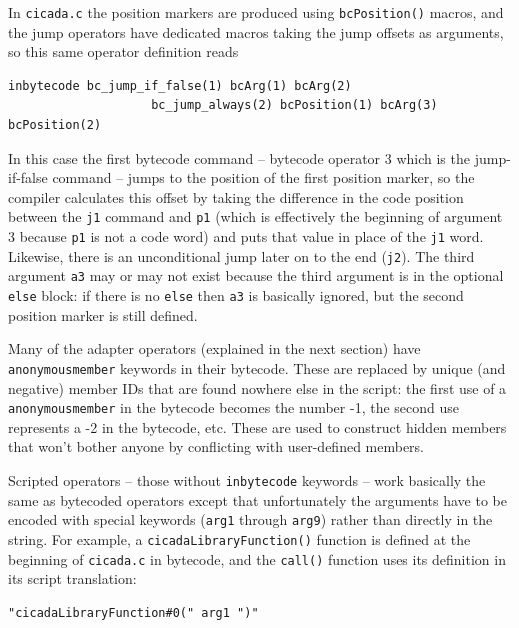 \documentclass{article}
\newenvironment{code}{
       \begin{list}{}{
               \setlength{\leftmargin}{.4in}
               \setlength{\rightmargin}{0in}
               \setlength{\topsep}{.2in}
       }
       \small
       \item[] }
       { \end{list}   }
\begin{document}
\noindent In \verb#cicada.c# the position markers are produced using \verb#bcPosition()# macros, and the jump operators have dedicated macros taking the jump offsets as arguments, so this same operator definition reads

\begin{code} \begin{verbatim}
inbytecode bc_jump_if_false(1) bcArg(1) bcArg(2)
                    bc_jump_always(2) bcPosition(1) bcArg(3) bcPosition(2)
\end{verbatim} \end{code}

\noindent In this case the first bytecode command -- bytecode operator 3 which is the jump-if-false command -- jumps to the position of the first position marker, so the compiler calculates this offset by taking the difference in the code position between the \verb#j1# command and \verb#p1# (which is effectively the beginning of argument 3 because \verb#p1# is not a code word) and puts that value in place of the \verb#j1# word.  Likewise, there is an unconditional jump later on to the end (\verb#j2#).  The third argument \verb#a3# may or may not exist because the third argument is in the optional \verb#else# block:  if there is no \verb#else# then \verb#a3# is basically ignored, but the second position marker is still defined.

Many of the adapter operators (explained in the next section) have \verb#anonymousmember# keywords in their bytecode.  These are replaced by unique (and negative) member IDs that are found nowhere else in the script:  the first use of a \verb#anonymousmember# in the bytecode becomes the number -1, the second use represents a -2 in the bytecode, etc.  These are used to construct hidden members that won't bother anyone by conflicting with user-defined members.

Scripted operators -- those without \verb#inbytecode# keywords -- work basically the same as bytecoded operators except that unfortunately the arguments have to be encoded with special keywords (\verb#arg1# through \verb#arg9#) rather than directly in the string.  For example, a \verb#cicadaLibraryFunction()# function is defined at the beginning of \verb#cicada.c# in bytecode, and the \verb#call()# function uses its definition in its script translation:

\begin{code} \begin{verbatim}
"cicadaLibraryFunction#0(" arg1 ")"
\end{verbatim} \end{code}
\end{document}

